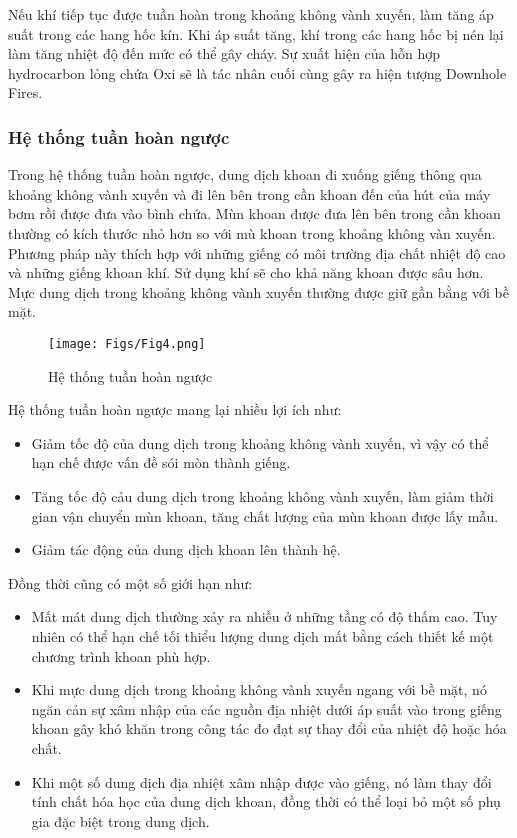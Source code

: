 \documentclass[12pt,a4paper]{article}
\begin{document}
	Nếu khí tiếp tục được tuần hoàn trong khoảng không vành xuyến, làm tăng áp suất trong các hang hốc kín. Khi áp suất tăng, khí trong các hang hốc bị nén lại làm tăng nhiệt độ đến mức có thể gây cháy. Sự xuất hiện của hỗn hợp hydrocarbon lỏng chứa Oxi sẽ là tác nhân cuối cùng gây ra hiện tượng Downhole Fires. 
\subsubsection{Hệ thống tuần hoàn ngược}
	Trong hệ thống tuần hoàn ngược\cite{driscoll1986groundwater}, dung dịch khoan đi xuống giếng thông qua khoảng không vành xuyến và đi lên bên trong cần khoan đến của hút của máy bơm rồi được đưa vào bình chứa. Mùn khoan được đưa lên bên trong cần khoan thường có kích thước nhỏ hơn so với mù khoan trong khoảng không vàn xuyến. Phương pháp này thích hợp với những giếng có môi trường địa chất nhiệt độ cao và những giếng khoan khí. Sử dụng khí sẽ cho khả năng khoan được sâu hơn. Mực dung dịch trong khoảng không vành xuyến thường được giữ gần bằng với bề mặt.
	\clearpage
	\begin{figure}[h]
		\centering
		\texttt{[image: Figs/Fig4.png]}
		\caption{Hệ thống tuần hoàn ngược\cite{culver1998drilling}}
	\end{figure}
	Hệ thống tuần hoàn ngược mang lại nhiều lợi ích như:
	\begin{itemize}
		\item Giảm tốc độ của dung dịch trong khoảng không vành xuyến, vì vậy có thể hạn chế được vấn đề sói mòn thành giếng.
		\item Tăng tốc độ cảu dung dịch trong khoảng không vành xuyến, làm giảm thời gian vận chuyển mùn khoan, tăng chất lượng của mùn khoan được lấy mẫu.
		\item Giảm tác động của dung dịch khoan lên thành hệ.
	\end{itemize}
	Đồng thời cũng có một số giới hạn như:
	\begin{itemize}
		\item Mất mát dung dịch thường xảy ra nhiều ở những tầng có độ thấm cao. Tuy nhiên có thể hạn chế tối thiểu lượng dung dịch mất bằng cách thiết kế một chương trình khoan phù hợp.
		\item Khi mực dung dịch trong khoảng không vành xuyến ngang với bề mặt, nó ngăn cản sự xâm nhập của các nguồn địa nhiệt dưới áp suất vào trong giếng khoan gây khó khăn trong công tác đo đạt sự thay đổi của nhiệt độ hoặc hóa chất.
		\item Khi một số dung dịch địa nhiệt xâm nhập được vào giếng, nó làm thay đổi tính chất hóa học của dung dịch khoan, đồng thời có thể loại bỏ một số phụ gia đặc biệt trong dung dịch.
	\end{itemize}
\end{document}
